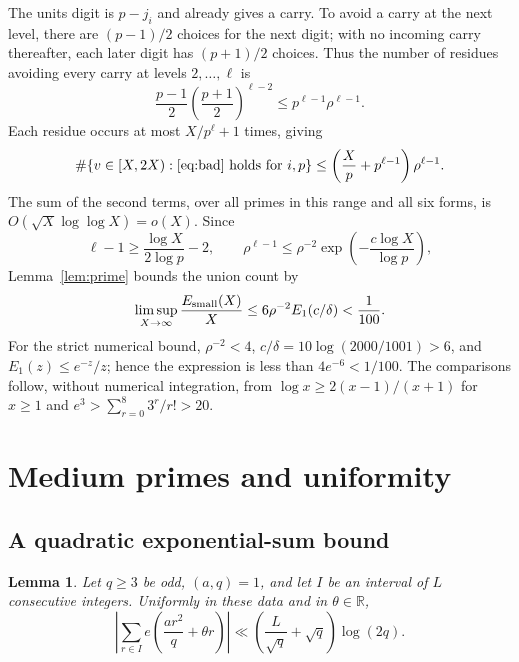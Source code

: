 \documentclass[11pt,a4paper]{article}
\newcommand{\R}{\mathbb R}
\newcommand{\1}{\mathbf 1}
\newtheorem{lemma}[theorem]{Lemma}
\numberwithin{equation}{section}
\begin{document}
The units digit is \(p-j_i\) and already gives a carry. To avoid a carry
at the next level, there are \((p-1)/2\) choices for the next digit;
with no incoming carry thereafter, each later digit has \((p+1)/2\)
choices. Thus the number of residues avoiding every carry at levels
\(2,\ldots,\ell\) is
\[
 \frac{p-1}{2}\left(\frac{p+1}{2}\right)^{\ell-2}
 \leq p^{\ell-1}\rho^{\ell-1}.
\]
Each residue occurs at most \(X/p^\ell+1\) times, giving
\begin{equation}\label{eq:smalllocal}
 \#\{v\in[X,2X):\text{\eqref{eq:bad} holds for }i,p\}
 \leq\left(\frac Xp+p^{\ell-1}\right)\rho^{\ell-1}.
\end{equation}
The sum of the second terms, over all primes in this range and all six
forms, is \(O(\sqrt X\log\log X)=o(X)\). Since
\[
 \ell-1\geq\frac{\log X}{2\log p}-2,
 \qquad \rho^{\ell-1}\leq\rho^{-2}
                  \exp\!\left(-\frac{c\log X}{\log p}\right),
\]
Lemma~\ref{lem:prime} bounds the union count by
\begin{equation}\label{eq:small}
 \limsup_{X\to\infty}\frac{E_{\rm small}(X)}X
 \leq6\rho^{-2}E_1(c/\delta)<\frac1{100}.
\end{equation}
For the strict numerical bound, \(\rho^{-2}<4\),
\(c/\delta=10\log(2000/1001)>6\), and \(E_1(z)\leq e^{-z}/z\);
hence the expression is less than \(4e^{-6}<1/100\).
The comparisons follow, without numerical integration, from
\(\log x\geq2(x-1)/(x+1)\) for \(x\geq1\) and
\(e^3>\sum_{r=0}^8 3^r/r!>20\).

\section{Medium primes and uniformity}\label{sec:medium}

\subsection{A quadratic exponential-sum bound}

\begin{lemma}\label{lem:quadratic}
Let \(q\geq3\) be odd, \((a,q)=1\), and let \(I\) be an interval of
\(L\) consecutive integers. Uniformly in these data and in \(\theta\in\R\),
\begin{equation}\label{eq:quadratic}
 \left|\sum_{r\in I}e\!\left(\frac{ar^2}{q}+\theta r\right)\right|
 \ll\left(\frac L{\sqrt q}+\sqrt q\right)\log(2q).
\end{equation}
\end{lemma}
\end{document}
